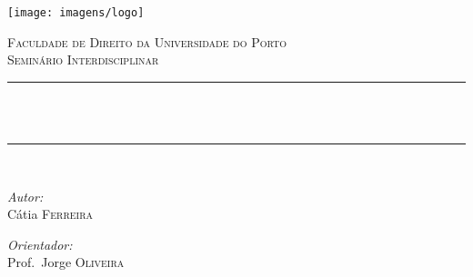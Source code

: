

\begin{titlepage}
\noindent \texttt{[image: imagens/logo]}~\\[1cm]
\begin{center}
 \textsc{\LARGE Faculdade de Direito da Universidade do Porto}\\[1.5cm]

\noindent \textsc{\Large Seminário Interdisciplinar}\\[0.5cm]

\rule{\linewidth}{0.5mm} \\[0.25cm]
{ \LARGE \bfseries \thetitle\\[0.4cm] }

\rule{\linewidth}{0.5mm} \\[1.5cm]


\begin{minipage}{0.4\textwidth}
\begin{flushleft} \large
\emph{Autor:}\\
Cátia \textsc{Ferreira}
\end{flushleft}
\end{minipage}
\begin{minipage}{0.4\textwidth}
\begin{flushright} \large
\emph{Orientador:} \\
Prof.~Jorge \textsc{Oliveira}
\end{flushright}
\end{minipage}

\vfill

{\large \thedate}

\end{center}
\end{titlepage}